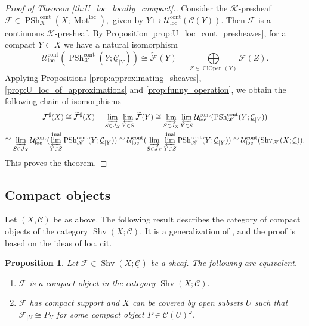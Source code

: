 \documentclass[11pt,leqno]{amsart}
\newtheorem{prop}[theo]{Proposition}
\numberwithin{equation}{section}
\def\wt{\widetilde}
\newcommand{\ms}[1]{\mathscr{#1}}
\newcommand{\msK}{\ms{K}}
\newcommand{\limproj}{\varprojlim}
\newcommand{\liminj}{\varinjlim}
\newcommand{\Mot}{\operatorname{Mot}}
\newcommand{\loc}{\operatorname{loc}}
\newcommand{\cont}{\operatorname{cont}}
\newcommand{\dual}{\operatorname{dual}}
\newcommand{\cF}{{\mathcal F}}
\newcommand{\cC}{{\mathcal C}}
\newcommand{\cU}{{\mathcal U}}
\newcommand{\un}{\underline}
\newcommand{\PSh}{\operatorname{PSh}}
\newcommand{\Sh}{\operatorname{Shv}}
\newcommand{\clopen}{\operatorname{ClOpen}}
\begin{document}
\begin{proof}[Proof of Theorem \ref{th:U_loc_locally_compact}.]
Consider the $\msK$-presheaf $\cF\in\PSh_{\msK}^{\cont}(X;\Mot^{\loc}),$ given by $Y\mapsto \cU_{\loc}^{\cont}(\un{\cC}(Y)).$ Then $\cF$ is a continuous $\msK$-presheaf. By Proposition \ref{prop:U_loc_cont_presheaves}, for a compact $Y\subset X$ we have a natural isomorphism
$$\cU_{\loc}^{\cont}(\PSh^{\cont}_{\msK}(Y;\un{\cC}_{\mid Y}))\cong \wt{\cF}(Y)=\bigoplus\limits_{Z\in\clopen(Y)}\cF(Z).$$
Applying Propositions \ref{prop:approximating_sheaves}, \ref{prop:U_loc_of_approximations} and \ref{prop:funny_operation}, we obtain the following chain of isomorphisms
\begin{multline*}\cF^{\sharp}(X)\cong\wt{\cF}^{\sharp}(X)=\liminj\limits_{S\in J_X}\limproj\limits_{Y\in S}\wt{\cF}(Y)\cong \liminj\limits_{S\in J_X}\limproj\limits_{Y\in S}\cU_{\loc}^{\cont}(\PSh^{\cont}_{\msK}(Y;\un{\cC}_{\mid Y}))\\ \cong
\liminj\limits_{S\in J_X}\cU_{\loc}^{\cont}(\limproj^{\dual}\limits_{Y\in S}\PSh^{\cont}_{\msK}(Y;\un{\cC}_{\mid Y}))\cong \cU_{\loc}^{\cont}(\liminj\limits_{S\in J_X} \limproj^{\dual}\limits_{Y\in S}\PSh^{\cont}_{\msK}(Y;\un{\cC}_{\mid Y}))\cong \cU_{\loc}^{\cont}(\Sh_{\msK}(X;\un{\cC})).\end{multline*}
This proves the theorem.
\end{proof}

\subsection{Compact objects}
\label{ssec:compact_sheaves}

Let 
$(X,\un{\cC})$ 
be as above. The following result describes the category of compact objects of the category 
$\Sh(X;\un{\cC}).$ It is a generalization of \cite[Theorem 0.1]{Nee01b}, and the proof is based on the ideas of loc. cit.

\begin{prop}\label{prop:compact_sheaves} Let $\cF\in\Sh(X;\un{\cC})$ be a sheaf. The following are equivalent.

\begin{enumerate}[label=(\roman*),ref=(\roman*)]
\item $\cF$ is a compact object in the category $\Sh(X;\un{\cC}).$ \label{comp_sheaf1}

\item $\cF$ has compact support and $X$ can be covered by open subsets $U$ such that $\cF_{\mid U}\cong P_U$ for some compact object $P\in\un{\cC}(U)^{\omega}.$ \label{comp_sheaf2}
\end{enumerate}\end{prop}  
\end{document}
